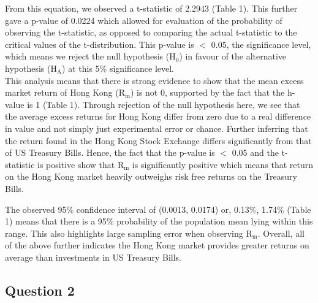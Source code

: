 \documentclass[11pt, english]{article}
\begin{document}
	From this equation, we observed a t-statistic of 2.2943 (Table 1). This further gave a p-value of 0.0224 which allowed for evaluation of the probability of observing the t-statistic, as opposed to comparing the actual t-statistic to the critical values of the t-distribution. This p-value is $<$ 0.05, the significance level, which means we reject the null hypothesis (H$_0$) in favour of the alternative hypothesis (H$\mathrm{_A}$) at this 5\% significance level.\\

	This analysis means that there is strong evidence to show that the mean excess market return of Hong Kong (R$\mathrm{_m}$) is not 0, supported by the fact that the h-value is 1 (Table 1). Through rejection of the null hypothesis here, we see that the average excess returns for Hong Kong differ from zero due to a real difference in value and not simply just experimental error or chance. Further inferring that the return found in the Hong Kong Stock Exchange differs significantly from that of US Treasury Bills. Hence, the fact that the p-value is $<$ 0.05 and the t-statistic is positive show that R$\mathrm{_m}$ is significantly positive which means that return on the Hong Kong market heavily outweighs risk free returns on the Treasury Bills. 

	The observed 95\% confidence interval of (0.0013, 0.0174) or, 0.13\%, 1.74\% (Table 1) means that there is a 95\% probability of the population mean lying within this range. This also highlights large sampling error when observing R$\mathrm{_m}$. Overall, all of the above further indicates the Hong Kong market provides greater returns on average than investments in US Treasury Bills.

\newpage

	\subsection{Question 2}
\end{document}
